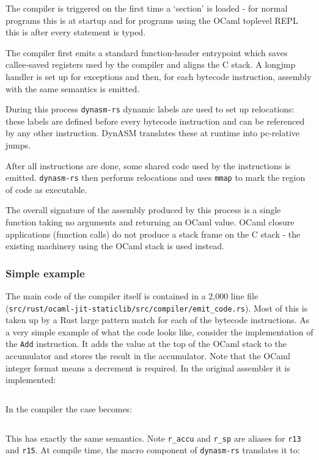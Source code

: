 The compiler is triggered on the first time a `section' is loaded - for normal programs this is at
startup and for programs using the OCaml toplevel REPL this is after every statement is typed.

The compiler first emits a standard function-header entrypoint which saves callee-saved registers
used by the compiler and aligns the C stack. A longjmp handler is set up for exceptions and then,
for each bytecode instruction, assembly with the same semantics is emitted.

During this process \texttt{dynasm-rs} dynamic labels are used to set up relocations: these
labels are defined before every bytecode instruction and can be referenced by any other
instruction. DynASM translates these at runtime into pc-relative jumps.

After all instructions are done, some shared code used by the instructions is emitted.
\texttt{dynasm-rs} then performs relocations and uses \texttt{mmap} to mark the region of code as
executable.

The overall signature of the assembly produced by this process is a single function taking no
arguments and returning an OCaml value. OCaml closure applications (function calls) do not produce
a stack frame on the C stack - the existing machinery using the OCaml stack is used instead.

\subsubsection{Simple example}

The main code of the compiler itself is contained in a 2,000 line file
(\texttt{src/rust/ocaml-jit-staticlib/src/compiler/emit\_code.rs}). Most of this is taken up by a
Rust large pattern match for each of the bytecode instructions. As a very simple example of what
the code looks like, consider the implementation of the \texttt{Add} instruction. It adds the value
at the top of the OCaml stack to the accumulator and stores the result in the accumulator. Note
that the OCaml integer format means a decrement is required. In the original assembler it is
implemented:

\inputminted{c}{snippets/add.c}

In the compiler the case becomes:

\inputminted{rust}{snippets/add.rs}

This has exactly the same semantics. Note \texttt{r\_accu} and \texttt{r\_sp}
are aliases for \texttt{r13} and \texttt{r15}.	At compile time, the macro component of
\texttt{dynasm-rs} translates it to:

